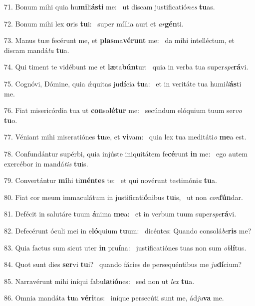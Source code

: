 71. Bonum mihi quia hu\textbf{mi}li\textbf{ás}\textbf{ti} me: \ast\  ut discam justificatió\textit{nes} \textbf{tu}as.\

72. Bonum mihi lex \textbf{o}ris \textbf{tu}i: \ast\  super míllia auri et \textit{ar}\textbf{gén}ti.\

73. Manus tuæ fecérunt me, et \textbf{plas}ma\textbf{vé}\textbf{runt} me: \ast\  da mihi intelléctum, et discam mandá\textit{ta} \textbf{tu}a.\

74. Qui timent te vidébunt me et \textbf{læ}ta\textbf{bún}tur: \ast\  quia in verba tua super\textit{spe}\textbf{rá}vi.\

75. Cognóvi, Dómine, quia ǽquitas ju\textbf{dí}cia \textbf{tu}a: \ast\  et in veritáte tua humi\textit{li}\textbf{ás}ti me.\

76. Fiat misericórdia tua ut \textbf{con}so\textbf{lé}\textbf{tur} me: \ast\  secúndum elóquium tuum ser\textit{vo} \textbf{tu}o.\

77. Véniant mihi miseratiónes \textbf{tu}æ, et \textbf{vi}vam: \ast\  quia lex tua meditáti\textit{o} \textbf{me}a est.\

78. Confundántur supérbi, quia injúste iniquitátem fe\textbf{cé}runt \textbf{in} me: \ast\  ego autem exercébor in mandá\textit{tis} \textbf{tu}is.\

79. Convertántur \textbf{mi}hi ti\textbf{mén}\textbf{tes} te: \ast\  et qui novérunt testimóni\textit{a} \textbf{tu}a.\

80. Fiat cor meum immaculátum in justificati\textbf{ó}nibus \textbf{tu}is, \ast\  ut non \textit{con}\textbf{fún}dar.\

81. Defécit in salutáre tuum \textbf{á}nima \textbf{me}a: \ast\  et in verbum tuum super\textit{spe}\textbf{rá}vi.\

82. Defecérunt óculi mei in e\textbf{ló}quium \textbf{tu}um: \ast\  dicéntes: Quando consolá\textit{be}\textbf{ris} me?\

83. Quia factus sum sicut uter \textbf{in} pru\textbf{í}na: \ast\  justificatiónes tuas non sum \textit{ob}\textbf{lí}tus.\

84. Quot sunt dies \textbf{ser}vi \textbf{tu}i? \ast\  quando fácies de persequéntibus me \textit{ju}\textbf{dí}cium?\

85. Narravérunt mihi iníqui fabu\textbf{la}ti\textbf{ó}nes: \ast\  sed non ut \textit{lex} \textbf{tu}a.\

86. Omnia mandáta \textbf{tu}a \textbf{vé}\textbf{ri}tas: \ast\  iníque persecúti sunt me, ád\textit{ju}\textbf{va} me.\

